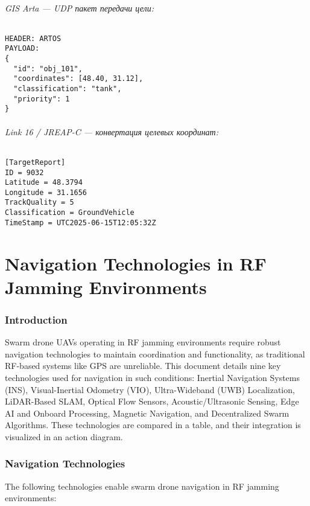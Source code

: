 \documentclass[12pt]{article}
\begin{document}
\paragraph{GIS Arta --- UDP пакет передачи цели:}
\begin{verbatim}
HEADER: ARTOS
PAYLOAD:
{
  "id": "obj_101",
  "coordinates": [48.40, 31.12],
  "classification": "tank",
  "priority": 1
}
\end{verbatim}

\paragraph{Link 16 / JREAP-C --- конвертация целевых координат:}
\begin{verbatim}
[TargetReport]
ID = 9032
Latitude = 48.3794
Longitude = 31.1656
TrackQuality = 5
Classification = GroundVehicle
TimeStamp = UTC2025-06-15T12:05:32Z
\end{verbatim}

\newpage

\part{Navigation Technologies in RF Jamming Environments}

\section{Introduction}
Swarm drone UAVs operating in RF jamming environments require robust navigation technologies to maintain coordination and functionality, as traditional RF-based systems like GPS are unreliable. This document details nine key technologies used for navigation in such conditions: Inertial Navigation Systems (INS), Visual-Inertial Odometry (VIO), Ultra-Wideband (UWB) Localization, LiDAR-Based SLAM, Optical Flow Sensors, Acoustic/Ultrasonic Sensing, Edge AI and Onboard Processing, Magnetic Navigation, and Decentralized Swarm Algorithms. These technologies are compared in a table, and their integration is visualized in an action diagram.

\section{Navigation Technologies}
The following technologies enable swarm drone navigation in RF jamming environments:
\end{document}
